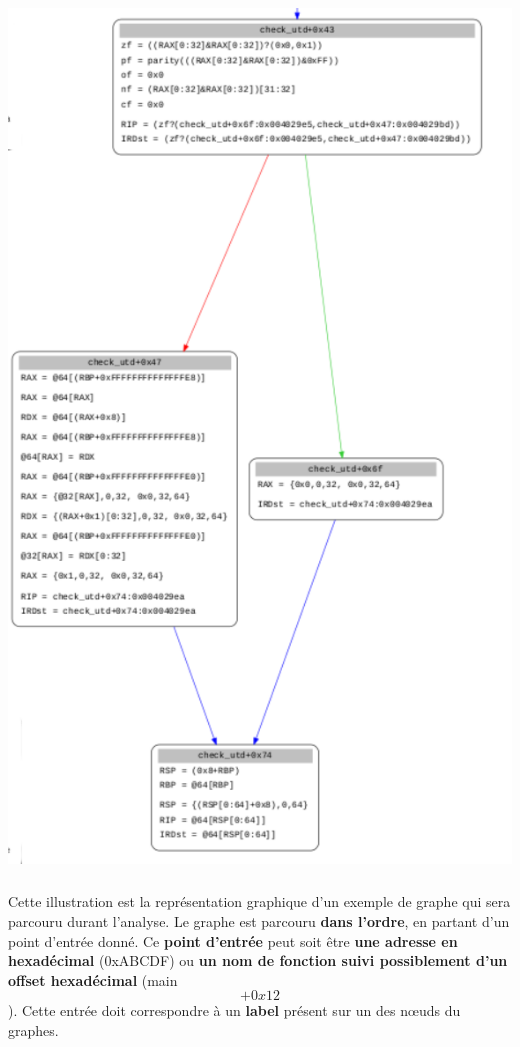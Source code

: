 \begin{center}
\includegraphics[scale=0.3]{condition.png}\newline
\end{center}
\subparagraph{}
Cette illustration est la représentation graphique d'un exemple de graphe qui sera parcouru durant l'analyse. Le graphe est parcouru \textbf{dans l'ordre},
en partant d'un point d'entrée donné. Ce \textbf{point d'entrée} peut soit être \textbf{une adresse en hexadécimal} (0xABCDF) ou \textbf{un nom de fonction
suivi possiblement d'un offset hexadécimal} (main\[+0x12\]). Cette entrée doit correspondre à un \textbf{label} présent sur un des nœuds du graphes.
